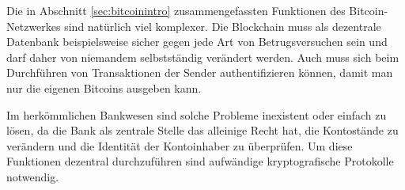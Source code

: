 Die in Abschnitt \ref{sec:bitcoinintro} zusammengefassten Funktionen des Bitcoin-Netzwerkes sind natürlich viel komplexer.
Die Blockchain muss als dezentrale Datenbank beispielsweise sicher gegen jede Art von Betrugsversuchen sein und darf daher von niemandem selbstständig verändert werden.
Auch muss sich beim Durchführen von Transaktionen der Sender authentifizieren können, damit man nur die eigenen Bitcoins ausgeben kann.

Im herkömmlichen Bankwesen sind solche Probleme inexistent oder einfach zu lösen, da die Bank als zentrale Stelle das alleinige Recht hat, die Kontostände zu verändern und die Identität der Kontoinhaber zu überprüfen.
Um diese Funktionen dezentral durchzuführen sind aufwändige kryptografische Protokolle notwendig.
